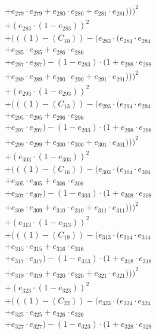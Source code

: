 \documentclass[10pt, a4paper]{article}
\begin{document}
\begin{small}
\begin{align*}
& + e_{279} \cdot e_{279} + e_{280} \cdot e_{280} + e_{281} \cdot e_{281})))^{2} \\
& + (e_{283} \cdot (1 - e_{283}))^{2} \\
& + (((1) - (C_{10})) - (e_{283} \cdot (e_{284} \cdot e_{284} \\
& + e_{285} \cdot e_{285} + e_{286} \cdot e_{286} \\
& + e_{287} \cdot e_{287}) - (1 - e_{283}) \cdot (1 + e_{288} \cdot e_{288} \\
& + e_{289} \cdot e_{289} + e_{290} \cdot e_{290} + e_{291} \cdot e_{291})))^{2} \\
& + (e_{293} \cdot (1 - e_{293}))^{2} \\
& + (((1) - (C_{13})) - (e_{293} \cdot (e_{294} \cdot e_{294} \\
& + e_{295} \cdot e_{295} + e_{296} \cdot e_{296} \\
& + e_{297} \cdot e_{297}) - (1 - e_{293}) \cdot (1 + e_{298} \cdot e_{298} \\
& + e_{299} \cdot e_{299} + e_{300} \cdot e_{300} + e_{301} \cdot e_{301})))^{2} \\
& + (e_{303} \cdot (1 - e_{303}))^{2} \\
& + (((1) - (C_{16})) - (e_{303} \cdot (e_{304} \cdot e_{304} \\
& + e_{305} \cdot e_{305} + e_{306} \cdot e_{306} \\
& + e_{307} \cdot e_{307}) - (1 - e_{303}) \cdot (1 + e_{308} \cdot e_{308} \\
& + e_{309} \cdot e_{309} + e_{310} \cdot e_{310} + e_{311} \cdot e_{311})))^{2} \\
& + (e_{313} \cdot (1 - e_{313}))^{2} \\
& + (((1) - (C_{19})) - (e_{313} \cdot (e_{314} \cdot e_{314} \\
& + e_{315} \cdot e_{315} + e_{316} \cdot e_{316} \\
& + e_{317} \cdot e_{317}) - (1 - e_{313}) \cdot (1 + e_{318} \cdot e_{318} \\
& + e_{319} \cdot e_{319} + e_{320} \cdot e_{320} + e_{321} \cdot e_{321})))^{2} \\
& + (e_{323} \cdot (1 - e_{323}))^{2} \\
& + (((1) - (C_{22})) - (e_{323} \cdot (e_{324} \cdot e_{324} \\
& + e_{325} \cdot e_{325} + e_{326} \cdot e_{326} \\
& + e_{327} \cdot e_{327}) - (1 - e_{323}) \cdot (1 + e_{328} \cdot e_{328} \\

\end{align*}
\end{small}
\end{document}
